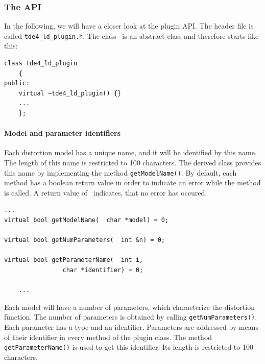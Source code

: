\documentclass[10pt,a4paper]{article}
\begin{document}
\subsubsection{The API}
In the following, we will have a closer look at the plugin API.
The header file is called {\tt tde4\_ld\_plugin.h}.
The class \tdeldplugin\ is an abstract class and therefore starts like this:
\begin{lstlisting}[language=mycpp]
class tde4_ld_plugin
	{
public:
	virtual ~tde4_ld_plugin() {}
	...
	};
\end{lstlisting}

\paragraph{Model and parameter identifiers}
Each distortion model has a unique name, and it will be identified by this name.
The length of this name is restricted to 100 characters.
The derived class provides this name by implementing the method {\tt getModelName()}.
By default, each method has a boolean return value in order to indicate an error
while the method is called. A return value of \true\ indicates, that no
error has occured.
\begin{lstlisting}[language=mycpp]
	...
virtual bool getModelName(	char *model) = 0;

virtual bool getNumParameters(	int &n) = 0;

virtual bool getParameterName(	int i,
				char *identifier) = 0;

	...
\end{lstlisting}

Each model will have a number of parameters, which characterize the distortion function.
The number of parameters is obtained by calling {\tt getNumParameters()}.
Each parameter has a type and an identifier. Parameters are addressed by means of their identifier
in every method of the plugin class. The method {\tt getParameterName()} is used to get this
identifier. Its length is restricted to 100 characters.
\end{document}
